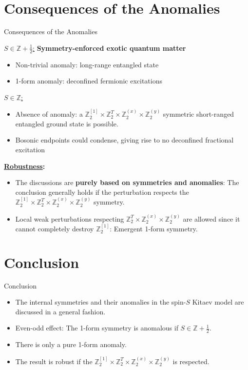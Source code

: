 \documentclass[professionalfont]{beamer}
\begin{document}
\section{Consequences of the Anomalies}
\begin{frame}{Consequences of the Anomalies}

    \underline{$S\in\mathbb{Z}+\frac{1}{2}$:} \textbf{Symmetry-enforced exotic quantum matter}
    \begin{itemize}
        \item Non-trivial anomaly: long-range entangled state
        \item 1-form anomaly: deconfined fermionic excitations
    \end{itemize}

    \underline{$S\in\mathbb{Z}$:}
    \begin{itemize}
        \item Absence of anomaly: a $\mathbb{Z}_2^{[1]} \times \mathbb{Z}^T_2 \times \mathbb{Z}^{(x)}_2 \times \mathbb{Z}^{(y)}_2$ symmetric short-ranged entangled ground state is possible.
        \item Bosonic endpoints could condense, giving rise to no deconfined fractional excitation
    \end{itemize}

\textbf{\underline{Robustness}:}
\begin{itemize}
    \item The discussions are \textbf{purely based on symmetries and anomalies}: The conclusion generally holds if the perturbation respects the $\mathbb{Z}_2^{[1]} \times \mathbb{Z}^T_2 \times \mathbb{Z}^{(x)}_2 \times \mathbb{Z}^{(y)}_2$ symmetry.
    
    \item Local weak perturbations respecting $\mathbb{Z}^T_2 \times \mathbb{Z}^{(x)}_2 \times \mathbb{Z}^{(y)}_2$ are allowed since it cannot completely destroy $\mathbb{Z}_2^{[1]}$: Emergent 1-form symmetry.
\end{itemize}
\end{frame}
\section{Conclusion}
\begin{frame}{Conclusion}
    \begin{itemize}
        \item The internal symmetries and their anomalies in the spin-$S$ Kitaev model are discussed in a general fashion.

        \item Even-odd effect: The 1-form symmetry is anomalous if $S\in\mathbb{Z}+\frac{1}{2}$.

        \item There is only a pure 1-form anomaly.

        \item The result is robust if the $\mathbb{Z}_2^{[1]} \times \mathbb{Z}^T_2 \times \mathbb{Z}^{(x)}_2 \times \mathbb{Z}^{(y)}_2$ is respected.
    \end{itemize}
\end{frame}

\end{document}
